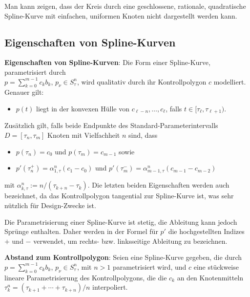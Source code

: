 Man kann zeigen, dass der Kreis durch eine geschlossene, rationale, quadratische
Spline-Kurve mit einfachen, uniformen Knoten nicht dargestellt werden kann.

\subsection{%
    Eigenschaften von Spline-Kurven%
}

\textbf{Eigenschaften von Spline-Kurven}:
Die Form einer Spline-Kurve, parametrisiert durch\\
$p = \sum_{k=0}^{m-1} c_k b_k$, $p_\nu \in S_\tau^n$,
wird qualitativ durch ihr Kontrollpolygon $c$ modelliert.
Genauer gilt:
\begin{itemize}
    \item
    $p(t)$ liegt in der konvexen Hülle von $c_{\ell-n}, \dotsc, c_\ell$, falls
    $t \in [\tau_\ell, \tau_{\ell+1})$.
\end{itemize}
Zusätzlich gilt, falls beide Endpunkte des Standard-Parameterintervalls $D = [\tau_n, \tau_m]$
Knoten mit Vielfachheit $n$ sind, dass
\begin{itemize}
    \item
    $p(\tau_n) = c_0$ und $p(\tau_m) = c_{m-1}$ sowie
    
    \item
    $p'(\tau_n^+) = \alpha_{1,\tau}^n (c_1 - c_0)$ und
    $p'(\tau_m^-) = \alpha_{m-1,\tau}^n (c_{m-1} - c_{m-2})$
\end{itemize}
mit $\alpha_{k,\tau}^n := n/(\tau_{k+n} - \tau_k)$.
Die letzten beiden Eigenschaften werden auch  bezeichnet,
da das Kontrollpolygon tangential zur Spline-Kurve ist, was sehr nützlich für Design-Zwecke ist.

Die Parametrisierung einer Spline-Kurve ist stetig, die Ableitung kann jedoch Sprünge enthalten.
Daher werden in der Formel für $p'$ die hochgestellten Indizes $+$ und $-$ verwendet,
um rechts- bzw. linksseitige Ableitung zu bezeichnen.

\linie
\pagebreak

\textbf{Abstand zum Kontrollpolygon}:
Seien eine Spline-Kurve gegeben, die durch $p = \sum_{k=0}^{m-1} c_k b_k$, $p_\nu \in S_\tau^n$,
mit $n > 1$ parametrisiert wird,
und $c$ eine stückweise lineare Parametrisierung des Kontrollpolygons,
die die $c_k$ an den Knotenmitteln $\tau_k^n = (\tau_{k+1} + \dotsb + \tau_{k+n})/n$
interpoliert.

